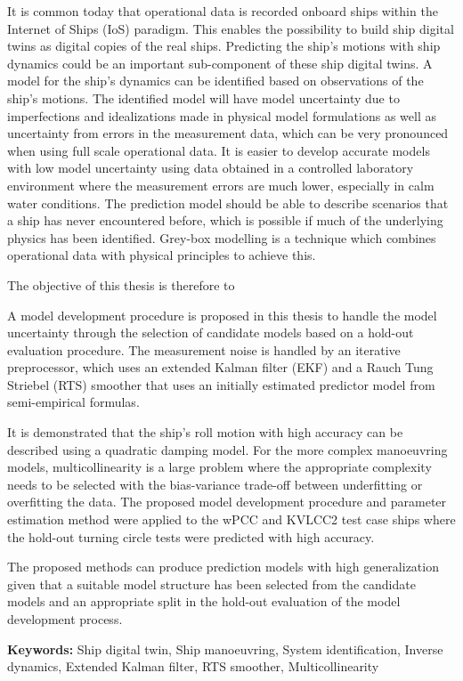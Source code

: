 
It is common today that operational data is recorded onboard ships within the Internet of Ships (IoS) paradigm. This enables the possibility to build ship digital twins as digital copies of the real ships. Predicting the ship's motions with ship dynamics could be an important sub-component of these ship digital twins. A model for the ship's dynamics can be identified based on observations of the ship's motions. 
The identified model will have model uncertainty due to imperfections and idealizations made in physical model formulations as well as uncertainty from errors in the measurement data, which can be very pronounced when using full scale operational data. It is easier to develop accurate models with low model uncertainty using data obtained in a controlled laboratory environment where the measurement errors are much lower, especially in calm water conditions. The prediction model should be able to describe scenarios that a ship has never encountered before, which is possible if much of the underlying physics has been identified. Grey-box modelling is a technique which combines operational data with physical principles to achieve this.  
 
The objective of this thesis is therefore to 
\noindent \objective 

A model development procedure is proposed in this thesis to handle the model uncertainty through the selection of candidate models based on a hold-out evaluation procedure. The measurement noise is handled by an iterative preprocessor, which uses an extended Kalman filter (EKF) and a Rauch Tung Striebel (RTS) smoother that uses an initially estimated predictor model from semi-empirical formulas.

It is demonstrated that the ship's roll motion with high accuracy can be described using a quadratic damping model. For the more complex manoeuvring models, multicollinearity is a large problem where the appropriate complexity needs to be selected with the bias-variance trade-off between underfitting or overfitting the data. 
The proposed model development procedure and parameter estimation method were applied to the wPCC and KVLCC2 test case ships where the hold-out turning circle tests were predicted with high accuracy.

The proposed methods can produce prediction models with high generalization given that a suitable model structure has been selected from the candidate models and an appropriate split in the hold-out evaluation of the model development process. 

\vspace{0.1cm}
\textbf{Keywords:} Ship digital twin, Ship manoeuvring, System identification, Inverse dynamics, Extended Kalman filter, RTS smoother, Multicollinearity
